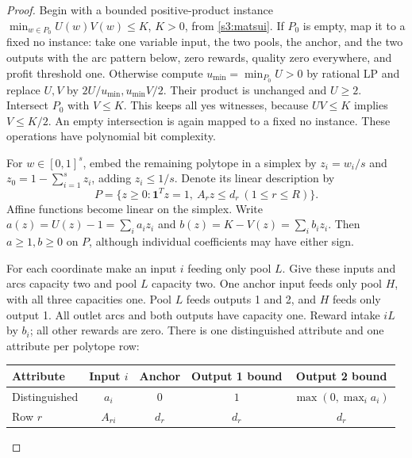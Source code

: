 \begin{proof}
Begin with a bounded positive-product instance
$\min_{w\in P_0}U(w)V(w)\le K$, $K>0$, from \cref{s3:matsui}.
If $P_0$ is empty, map it to a fixed no instance: take one variable input, the two pools,
the anchor, and the two outputs with the arc pattern below, zero rewards,
quality zero everywhere, and profit threshold one. Otherwise compute
$u_{\min}=\min_{P_0}U>0$ by rational LP and replace $U,V$ by
$2U/u_{\min},u_{\min}V/2$. Their product is unchanged and $U\ge2$.
Intersect $P_0$ with $V\le K$. This keeps all yes witnesses, because
$UV\le K$ implies $V\le K/2$. An empty intersection is again mapped
to a fixed no instance. These operations have polynomial bit complexity.

For $w\in[0,1]^s$, embed the remaining polytope in a simplex by
$z_i=w_i/s$ and $z_0=1-\sum_{i=1}^s z_i$, adding $z_i\le1/s$.
Denote its linear description by
\[
 P=\{z\ge0:\mathbf1^Tz=1,\ A_rz\le d_r\ (1\le r\le R)\}.
\]
Affine functions become linear on the simplex. Write
$a(z)=U(z)-1=\sum_i a_iz_i$ and $b(z)=K-V(z)=\sum_i b_iz_i$.
Then $a\ge1,b\ge0$ on $P$, although individual coefficients may
have either sign.

For each coordinate make an input $i$ feeding only pool $L$. Give these
inputs and arcs capacity two and pool $L$ capacity two. One anchor
input feeds only pool $H$, with all three capacities one. Pool $L$
feeds outputs 1 and 2, and $H$ feeds only output 1. All outlet arcs
and both outputs have capacity one. Reward intake $iL$ by $b_i$;
all other rewards are zero. There is one distinguished attribute and
one attribute per polytope row:
\begin{center}
\begin{tabular}{lcccc}
\toprule
Attribute & Input $i$ & Anchor & Output 1 bound & Output 2 bound\\
\midrule
Distinguished & $a_i$ & $0$ & $1$ & $\max(0,\max_i a_i)$\\
Row $r$ & $A_{ri}$ & $d_r$ & $d_r$ & $d_r$\\
\bottomrule
\end{tabular}
\end{center}


\end{proof}
